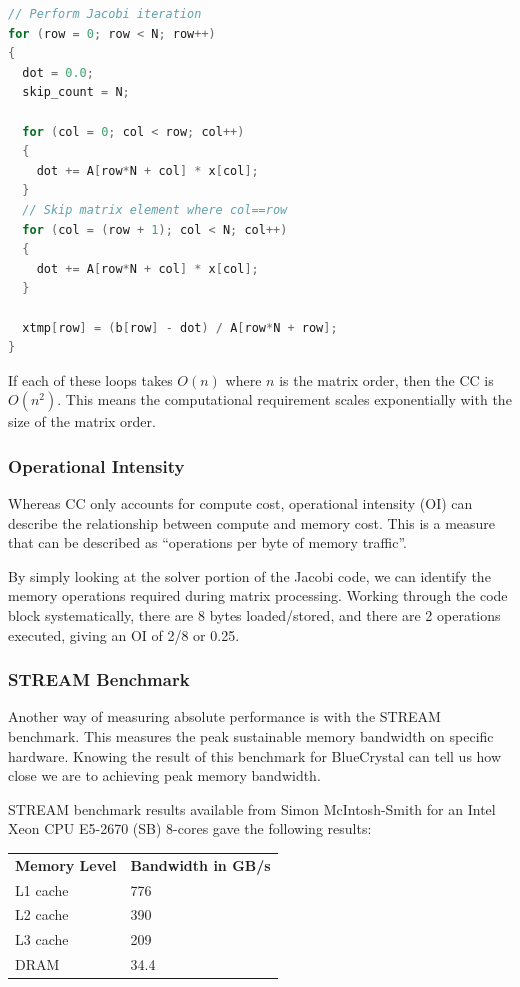 \documentclass{article}
\begin{document}
\begin{lstlisting}[language=C]
// Perform Jacobi iteration
for (row = 0; row < N; row++)
{
  dot = 0.0;
  skip_count = N;

  for (col = 0; col < row; col++)
  {
    dot += A[row*N + col] * x[col];
  }
  // Skip matrix element where col==row
  for (col = (row + 1); col < N; col++)
  {
    dot += A[row*N + col] * x[col];
  }

  xtmp[row] = (b[row] - dot) / A[row*N + row];
}
\end{lstlisting}

If each of these loops takes \(O(n)\) where \(n\) is the matrix
order, then the CC is \(O(n^2)\). This means the computational
requirement scales exponentially with the size of the matrix order.

\subsubsection{Operational Intensity}
Whereas CC only accounts for compute cost, operational intensity (OI)
can describe the relationship between compute and memory cost. This is
a measure that can be described as ``operations per byte of memory
traffic''.

By simply looking at the solver portion of the Jacobi code, we can
identify the memory operations required during matrix
processing. Working through the code block systematically, there are 8
bytes loaded/stored, and there are 2 operations executed, giving an OI
of 2/8 or 0.25.

\subsubsection{STREAM Benchmark}
Another way of measuring absolute performance is with the STREAM
benchmark. This measures the peak sustainable memory bandwidth on
specific hardware. Knowing the result of this benchmark for
BlueCrystal can tell us how close we are to achieving peak memory
bandwidth.

STREAM benchmark results available from Simon McIntosh-Smith for an
Intel Xeon CPU E5-2670 (SB) 8-cores gave the following results:

\begin{center}
  \begin{tabular}{|l|l|}
    \hline
    \textbf{Memory Level} & \textbf{Bandwidth in GB/s} \\
    L1 cache & 776 \\
    L2 cache & 390 \\
    L3 cache & 209 \\
    DRAM & 34.4 \\
    \hline
  \end{tabular}
\end{center}
\end{document}
